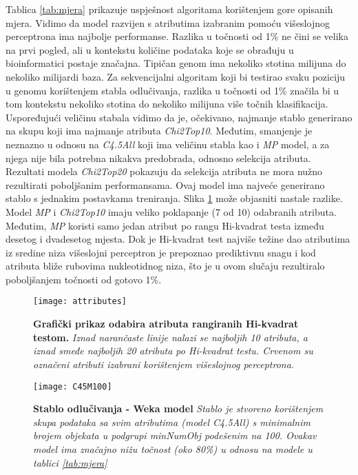 Tablica \ref{tab:mjera} prikazuje uspješnost algoritama korištenjem gore opisanih mjera. Vidimo da model razvijen s atributima izabranim pomoću višeslojnog perceptrona ima najbolje performanse. Razlika u točnosti od 1\% ne čini se velika na prvi pogled, ali u kontekstu količine podataka koje se obrađuju u bioinformatici postaje značajna. Tipičan genom ima nekoliko stotina milijuna do nekoliko milijardi baza. Za sekvencijalni algoritam koji bi testirao svaku poziciju u genomu korištenjem stabla odlučivanja, razlika u točnosti od 1\% značila bi u tom kontekstu nekoliko stotina do nekoliko milijuna više točnih klasifikacija.
Uspoređujući veličinu stabala vidimo da je, očekivano, najmanje stablo generirano na skupu koji ima najmanje atributa \textit{Chi2Top10}. Međutim, smanjenje je neznazno u odnosu na \textit{C4.5All} koji ima veličinu stabla kao i \textit{MP} model, a za njega nije bila potrebna nikakva predobrada, odnosno selekcija atributa. 
Rezultati modela \textit{Chi2Top20} pokazuju da selekcija atributa ne mora nužno rezultirati poboljšanim performansama. Ovaj model ima najveće generirano stablo s jednakim postavkama treniranja. Slika \ref{fig:attributes} može objasniti nastale razlike. Model \textit{MP} i \textit{Chi2Top10} imaju veliko poklapanje (7 od 10) odabranih atributa. Međutim, \textit{MP} koristi samo jedan atribut po rangu Hi-kvadrat testa između desetog i dvadesetog mjesta. Dok je Hi-kvadrat test najviše težine dao atributima iz sredine niza višeslojni perceptron je prepoznao prediktivnu snagu i kod atributa bliže rubovima nukleotidnog niza, što je u ovom slučaju rezultiralo poboljšanjem točnosti od gotovo 1\%.
\begin{figure}[!ht]
    \centering
    \texttt{[image: attributes]}
    \caption[Grafički prikaz odabira atributa]{\textbf{Grafički prikaz odabira atributa rangiranih Hi-kvadrat testom.}  \textit{Iznad narančaste linije nalazi se najboljih 10 atributa, a iznad smeđe najboljih 20 atributa po Hi-kvadrat testu. Crvenom su označeni atributi izabrani korištenjem višeslojnog perceptrona.}}
    \label{fig:attributes}
\end{figure}
\begin{figure}[!ht]
    \centering
    \texttt{[image: C45M100]}
    \caption[Primjer modela stabla odlučivanja]{\textbf{Stablo odlučivanja - Weka model}  \textit{Stablo je stvoreno korištenjem skupa podataka sa svim atributima (model C4.5All) s minimalnim brojem objekata u podgrupi \textit{minNumObj} podešenim na 100. Ovakav model ima značajno nižu točnost (oko 80\%) u odnosu na modele u tablici \ref{tab:mjera}}}
    \label{fig:C45M100}
\end{figure}

